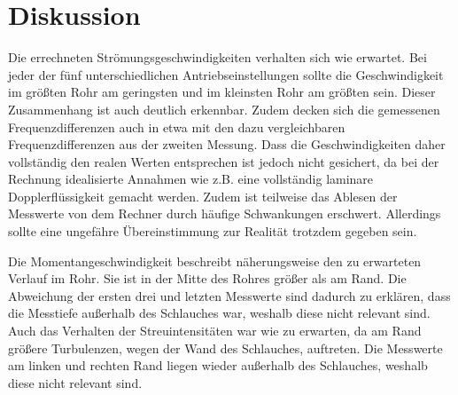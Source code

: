 \section{Diskussion}
\label{sec:Diskussion}
Die errechneten Strömungsgeschwindigkeiten verhalten sich wie erwartet. Bei jeder der fünf unterschiedlichen
Antriebseinstellungen sollte die Geschwindigkeit im größten Rohr am geringsten und im kleinsten Rohr am größten sein.
Dieser Zusammenhang ist auch deutlich erkennbar. Zudem decken sich die gemessenen Frequenzdifferenzen auch in etwa mit den
dazu vergleichbaren Frequenzdifferenzen aus der zweiten Messung. Dass die Geschwindigkeiten daher vollständig den realen Werten entsprechen
ist jedoch nicht gesichert, da bei der Rechnung idealisierte Annahmen wie z.B. eine vollständig laminare Dopplerflüssigkeit gemacht werden.
Zudem ist teilweise das Ablesen der Messwerte von dem Rechner durch häufige Schwankungen erschwert.
Allerdings sollte eine ungefähre Übereinstimmung zur Realität trotzdem gegeben sein.

Die Momentangeschwindigkeit beschreibt näherungsweise den zu erwarteten Verlauf im Rohr. Sie ist in der Mitte des Rohres größer als am Rand. Die Abweichung der ersten drei und letzten
Messwerte sind dadurch zu erklären, dass die Messtiefe außerhalb des Schlauches war, weshalb diese nicht relevant sind.
Auch das Verhalten der Streuintensitäten war wie zu erwarten, da am Rand größere Turbulenzen, wegen der Wand des Schlauches, auftreten. Die Messwerte am linken und rechten Rand liegen
wieder außerhalb des Schlauches, weshalb diese nicht relevant sind.
